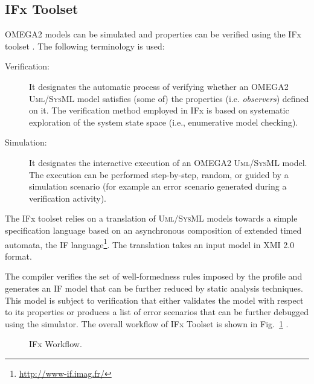 \documentclass[a4paper,twoside]{article}
\def\sysml{\textsc{SysML}}
\def\uml{\textsc{Uml}}
\begin{document}
\subsection{IFx Toolset}

\noindent OMEGA2 models can be simulated and properties can be verified using the IFx toolset \cite{MBozga2004}. The following terminology is used: 

\begin{description}
\item[Verification:] It designates  the  automatic  process  of  verifying  whether  an  OMEGA2  \uml{}/\sysml{} model  satisfies  (some  of)  the  properties  (i.e. \textit{observers})  defined  on  it.  The  verification  method employed in IFx is based on systematic exploration of the system state space (i.e., enumerative model checking). 
\item[Simulation:] It designates  the  interactive  execution  of  an  OMEGA2  \uml{}/\sysml{}  model.  The execution  can    be  performed  step-by-step,  random,  or  guided  by  a  simulation  scenario  (for example an error scenario generated during a verification activity). 
\end{description}

The IFx toolset relies on a translation of \uml{}/\sysml{} models towards a simple specification language based on an asynchronous composition of extended timed automata, the IF language\footnote{\url{http://www-if.imag.fr/}}. The translation takes an input model in XMI 2.0 format. 

The compiler verifies the set of well-formedness rules imposed by the profile and generates an IF model that can be further reduced by static analysis techniques. This model is subject to verification that either validates the model with respect to its properties or produces a list of error scenarios that can be further debugged using the simulator. The overall workflow  of IFx Toolset is shown in Fig.~\ref{fig:flow} \cite{Omegaifx}.


\begin{figure}[!htb]
  \centering
  {}
  \caption{IFx Workflow\cite{Omegaifx}.}
  \label{fig:flow}
\end{figure}
 
\end{document}
